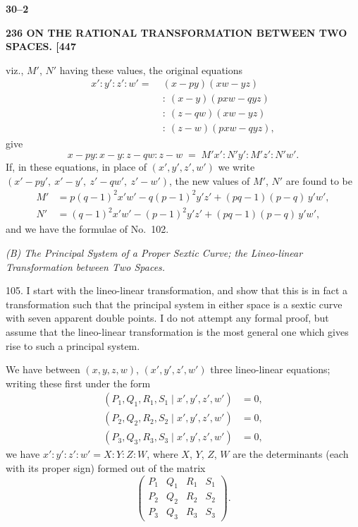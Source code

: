 \documentclass[11pt]{article}
\begin{document}
\medskip
\noindent\textbf{\hfill 30--2}

\medskip
\noindent\textbf{236 \hfill ON THE RATIONAL TRANSFORMATION BETWEEN TWO SPACES. \hfill [447}

\medskip

viz., $M'$, $N'$ having these values, the original equations
\begin{align*}
x' : y' : z' : w' = \;& (x - py)(xw - yz)\\
& :\ (x - y)(pxw - qyz)\\
& :\ (z - qw)(xw - yz)\\
& :\ (z - w)(pxw - qyz),
\end{align*}
give
\[ x - py : x - y : z - qw : z - w \;=\; M'x' : N'y' : M'z' : N'w'. \]
If, in these equations, in place of $(x', y', z', w')$ we write $(x' - py',\ x' - y',\ z' - qw',\ z' - w')$,
the new values of $M'$, $N'$ are found to be
\begin{align*}
M' &= p(q - 1)^2 x'w' - q(p - 1)^2 y'z' + (pq - 1)(p - q)\,y'w',\\
N' &= (q - 1)^2 x'w' - (p - 1)^2 y'z' + (pq - 1)(p - q)\,y'w',
\end{align*}
and we have the formulae of No.~102.

\medskip
\begin{center}\textit{(B) The Principal System of a Proper Sextic Curve; the Lineo-linear Transformation between Two Spaces.}\end{center}

105. I start with the lineo-linear transformation, and show that this is in fact
a transformation such that the principal system in either space is a sextic curve with
seven apparent double points. I do not attempt any formal proof, but assume that
the lineo-linear transformation is the most general one which gives rise to such a
principal system.

We have between $(x, y, z, w)$, $(x', y', z', w')$ three lineo-linear equations; writing
these first under the form
\begin{align*}
(P_1, Q_1, R_1, S_1 \mid x', y', z', w') &= 0,\\
(P_2, Q_2, R_2, S_2 \mid x', y', z', w') &= 0,\\
(P_3, Q_3, R_3, S_3 \mid x', y', z', w') &= 0,
\end{align*}
we have $x':y':z':w' = X:Y:Z:W$, where $X$, $Y$, $Z$, $W$ are the determinants
(each with its proper sign) formed out of the matrix
\[ \begin{pmatrix} P_1 & Q_1 & R_1 & S_1 \\ P_2 & Q_2 & R_2 & S_2 \\ P_3 & Q_3 & R_3 & S_3 \end{pmatrix}. \]
\end{document}
